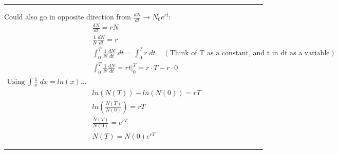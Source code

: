 \documentclass{article}
\newcommand*\circled[1]{\tikz[baseline=(char.base)]{
            \node[shape=circle,draw,inner sep=2pt] (char) {#1};}}
\begin{document}
\rule[0.5ex]{\linewidth}{1pt}

\circled{4} Could also go in opposite direction from $\frac{dN}{dt} \rightarrow N_0 e^{rt}$:
\begin{align*}
&	\frac{dN}{dt}=rN\\
&	\frac{1}{N}\frac{dN}{dt}=r\\
&	\int_0^T \frac{1}{N}\frac{dN}{dt} \; dt = \int_0^T r\; dt \;\;\;\;(\text{Think of T as a constant, and t in dt as a variable})\\
&	\int_0^T \frac{1}{N}\frac{dN}{dt}  = r t \vert_0^T = r \cdot T - r \cdot 0\\
	\text{Using} \; \int \frac{1}{x}\; dx = ln(x)...\\
&	ln(N(T))-ln(N(0))=rT\\
& ln\left( \frac{N(T)}{N(0)}\right) = rT\\
& \frac{N(T)}{N(0)}= e^{rT}\\
& N(T)=N(0)e^{rT}
\end{align*}


\rule[0.5ex]{\linewidth}{1pt}
\end{document}
